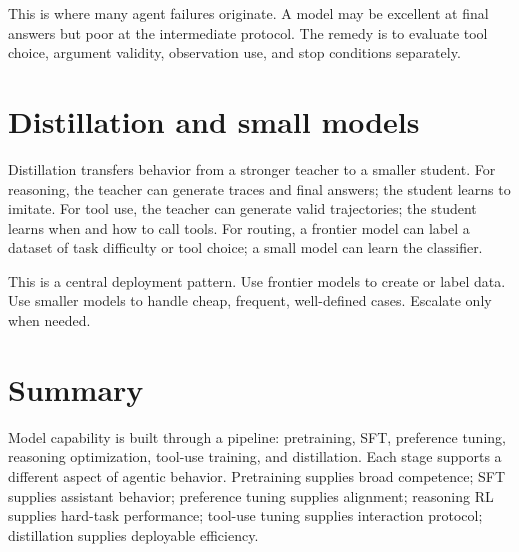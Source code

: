 This is where many agent failures originate. A model may be excellent at final answers but poor at the intermediate protocol. The remedy is to evaluate tool choice, argument validity, observation use, and stop conditions separately.

\section{Distillation and small models}

Distillation transfers behavior from a stronger teacher to a smaller student. For reasoning, the teacher can generate traces and final answers; the student learns to imitate. For tool use, the teacher can generate valid trajectories; the student learns when and how to call tools. For routing, a frontier model can label a dataset of task difficulty or tool choice; a small model can learn the classifier.

This is a central deployment pattern. Use frontier models to create or label data. Use smaller models to handle cheap, frequent, well-defined cases. Escalate only when needed.

\section{Summary}

Model capability is built through a pipeline: pretraining, SFT, preference tuning, reasoning optimization, tool-use training, and distillation. Each stage supports a different aspect of agentic behavior. Pretraining supplies broad competence; SFT supplies assistant behavior; preference tuning supplies alignment; reasoning RL supplies hard-task performance; tool-use tuning supplies interaction protocol; distillation supplies deployable efficiency.
